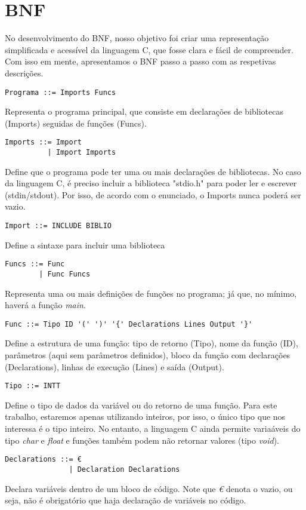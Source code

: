 \documentclass[12pt,a4paper]{report}
\begin{document}
\section{BNF}
No desenvolvimento do BNF, nosso objetivo foi criar uma representação simplificada e acessível da linguagem C, que fosse clara e fácil de compreender. Com isso em mente, apresentamos o BNF passo a passo com as respetivas descrições.
\begin{lstlisting}
Programa ::= Imports Funcs
\end{lstlisting}
Representa o programa principal, que consiste em declarações de bibliotecas (Imports) seguidas de funções (Funcs).
\begin{lstlisting}
Imports ::= Import
          | Import Imports 
\end{lstlisting}
Define que o programa pode ter uma ou mais declarações de bibliotecas. No caso da linguagem C, é preciso incluir a biblioteca "stdio.h" para poder ler e escrever (stdin/stdout). Por isso, de acordo com o enunciado, o Imports nunca poderá ser vazio.
\begin{lstlisting}
Import ::= INCLUDE BIBLIO  
\end{lstlisting}
Define a sintaxe para incluir uma biblioteca
\begin{lstlisting}
Funcs ::= Func
        | Func Funcs
\end{lstlisting}
Representa uma ou mais definições de funções no programa; já que, no mínimo, haverá a função \emph{main}.
\begin{lstlisting}
Func ::= Tipo ID '(' ')' '{' Declarations Lines Output '}'
\end{lstlisting}
Define a estrutura de uma função: tipo de retorno (Tipo), nome da função (ID), parâmetros (aqui sem parâmetros definidos), bloco da função com declarações (Declarations), linhas de execução (Lines) e saída (Output).
\begin{lstlisting}
Tipo ::= INTT
\end{lstlisting}
Define o tipo de dados da variável ou do retorno de uma função. Para este trabalho, estaremos apenas utilizando inteiros, por isso, o único tipo que nos interessa é o tipo inteiro. No entanto, a linguagem C ainda permite variaáveis do tipo \emph{char} e \emph{float} e funções também podem não retornar valores (tipo \emph{void}).
\begin{lstlisting}
Declarations ::= €
               | Declaration Declarations
\end{lstlisting}
Declara variáveis dentro de um bloco de código. Note que \emph{€} denota o vazio, ou seja, não é obrigatório que haja declaração de variáveis no código.
\end{document}
